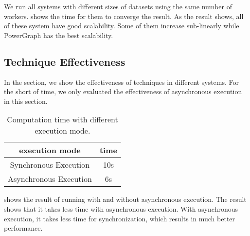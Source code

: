 We run all systems with different sizes of datasets using
the same number of workers.  shows the time
for them to converge the result. As the result shows,
all of these system have good scalability. Some of them increase
sub-linearly while PowerGraph has the best scalability.


\subsection{Technique Effectiveness} \label{subsec:technique}
In the section, we show the effectiveness of techniques in
different systems. For the short of time, we only evaluated
the effectiveness of asynchronous execution in this section.

\begin{table}
  \center
  \begin{tabular}{c|c}
    \hline
    \textbf{execution mode} & \textbf{time} \\
    \hline
    Synchronous Execution & 10s \\
    \hline
    Asynchronous Execution & 6s
  \end{tabular}
  \caption{Computation time with different execution mode.}
  \label{tab:asyn}

\end{table}

 shows the result of running with and without asynchronous
execution. The result shows that it takes less time with asynchronous
execution. With asynchronous execution, it takes less time for synchronization,
which results in much better performance.

